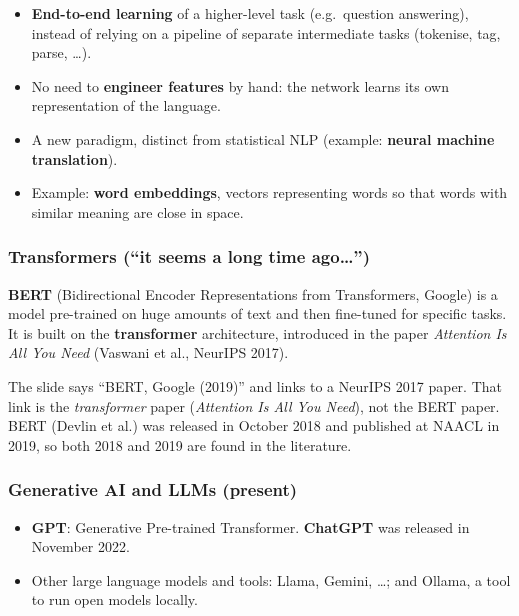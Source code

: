 \begin{itemize}[nosep]
  \item \textbf{End-to-end learning} of a higher-level task (e.g.\ question answering),
        instead of relying on a pipeline of separate intermediate tasks (tokenise, tag,
        parse, \ldots).
  \item No need to \textbf{engineer features} by hand: the network learns its own
        representation of the language.
  \item A new paradigm, distinct from statistical NLP (example: \textbf{neural machine
        translation}).
  \item Example: \textbf{word embeddings}, vectors representing words so that words
        with similar meaning are close in space.
\end{itemize}

\subsubsection{Transformers (``it seems a long time ago\ldots'')}

\textbf{BERT} (Bidirectional Encoder Representations from Transformers, Google) is a
model pre-trained on huge amounts of text and then fine-tuned for specific tasks. It is
built on the \textbf{transformer} architecture, introduced in the paper \emph{Attention
Is All You Need} (Vaswani et al., NeurIPS 2017).

\begin{nbwarning}
The slide says ``BERT, Google (2019)'' and links to a NeurIPS 2017 paper. That link is the
\emph{transformer} paper (\emph{Attention Is All You Need}), not the BERT paper. BERT
(Devlin et al.) was released in October 2018 and published at NAACL in 2019, so both
2018 and 2019 are found in the literature.
\end{nbwarning}

\subsubsection{Generative AI and LLMs (present)}

\begin{itemize}[nosep]
  \item \textbf{GPT}: Generative Pre-trained Transformer. \textbf{ChatGPT} was released in
        November 2022.
  \item Other large language models and tools: Llama, Gemini, \ldots; and Ollama, a tool
        to run open models locally.
\end{itemize}
